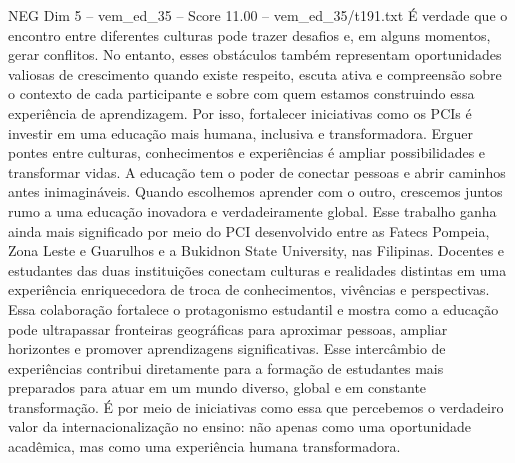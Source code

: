 \begin{textsample}{NEG Dim 5 – vem\_ed\_35 – Score 11.00 – vem\_ed\_35/t191.txt}
É verdade que o encontro entre diferentes culturas pode trazer desafios e, em alguns momentos, gerar conflitos.
No entanto, esses obstáculos também representam oportunidades valiosas de crescimento quando existe respeito, escuta ativa e compreensão sobre o contexto de cada participante e sobre com quem estamos construindo essa experiência de aprendizagem.
Por isso, fortalecer iniciativas como os PCIs é investir em uma educação mais humana, inclusiva e transformadora.
Erguer pontes entre culturas, conhecimentos e experiências é ampliar possibilidades e transformar vidas.
A educação tem o poder de conectar pessoas e abrir caminhos antes inimagináveis.
Quando escolhemos aprender com o outro, crescemos juntos rumo a uma educação inovadora e verdadeiramente global.
Esse trabalho ganha ainda mais significado por meio do PCI desenvolvido entre as Fatecs Pompeia, Zona Leste e Guarulhos e a Bukidnon State University, nas Filipinas.
Docentes e estudantes das duas instituições conectam culturas e realidades distintas em uma experiência enriquecedora de troca de conhecimentos, vivências e perspectivas.
Essa colaboração fortalece o protagonismo estudantil e mostra como a educação pode ultrapassar fronteiras geográficas para aproximar pessoas, ampliar horizontes e promover aprendizagens significativas.
Esse intercâmbio de experiências contribui diretamente para a formação de estudantes mais preparados para atuar em um mundo diverso, global e em constante transformação.
É por meio de iniciativas como essa que percebemos o verdadeiro valor da internacionalização no ensino: não apenas como uma oportunidade acadêmica, mas como uma experiência humana transformadora.

\end{textsample}
